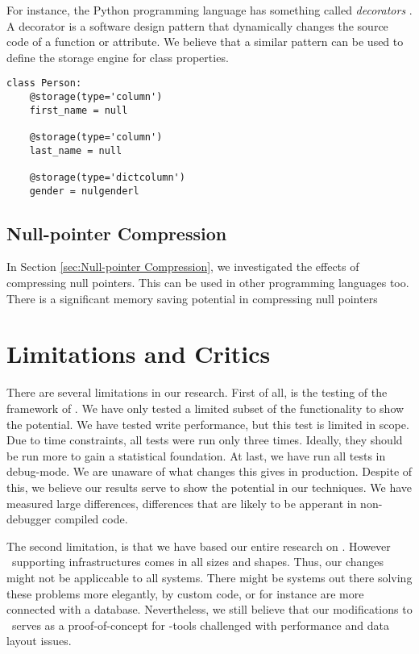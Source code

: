 For instance, the Python programming language has something called \textit{decorators} \cite{noauthor_undated-aq}. A decorator is a software design pattern that dynamically changes the source code of a function or attribute. We believe that a similar pattern can be used to define the storage engine for class properties.

\begin{lstlisting}
class Person:
    @storage(type='column')
    first_name = null

    @storage(type='column')
    last_name = null

    @storage(type='dictcolumn')
    gender = nulgenderl
\end{lstlisting}


\subsection{Null-pointer Compression}
\label{sub:Null-pointer Compression}
In Section \ref{sec:Null-pointer Compression}, we investigated the effects of compressing null pointers. This can be used in other programming languages too. There is a significant memory saving potential in compressing null pointers 

\section{Limitations and Critics}
\label{sec:Limitations and Critics}
There are several limitations in our research. First of all, is the testing of the framework of . We have only tested a limited subset of the functionality to show the potential. We have tested write performance, but this test is limited in scope. Due to time constraints, all tests were run only three times. Ideally, they should be run more to gain a statistical foundation. At last, we have run all tests in debug-mode. We are unaware of what changes this gives in production. Despite of this, we believe our results serve to show the potential in our techniques. We have measured large differences, differences that are likely to be apperant in non-debugger compiled code.

The second limitation, is that we have based our entire research on \gap. However \mde~supporting infrastructures comes in all sizes and shapes. Thus, our changes might not be appliccable to all systems. There might be systems out there solving these problems more elegantly, by custom code, or for instance are more connected with a database. Nevertheless, we still believe that our modifications to \gap~serves as a proof-of-concept for \mde-tools challenged with performance and data layout issues.

